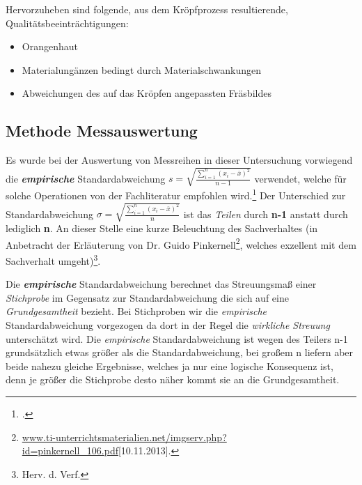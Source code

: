 \documentclass[12pt,a4paper,parskip]{scrartcl}
\begin{document}
{Hervorzuheben sind folgende, aus dem Kröpfprozess resultierende, Qualitätsbeeinträchtigungen:
\begin{itemize}
\item Orangenhaut
\item Materialungänzen bedingt durch Materialschwankungen
\item Abweichungen des auf das Kröpfen angepassten Fräsbildes
\end{itemize}









\subsection{Methode Messauswertung}
Es wurde bei der Auswertung von Messreihen in dieser Untersuchung vorwiegend die \textbf{\emph{empirische}} Standardabweichung $ s= \sqrt{\frac{\sum \limits_{i=1}^n (x_i - \bar{x})^2}{n-1}}$ verwendet, welche für solche Operationen von der Fachliteratur empfohlen wird.\footcite[Vgl.][301]{mf} Der Unterschied zur Standardabweichung $ \sigma = \sqrt{\frac{\sum \limits_{i=1}^n (x_i - \bar{x})^2}{n}}$ ist das \emph{Teilen} durch \textbf{n-1} anstatt durch lediglich \textbf{n}.
 An dieser Stelle eine kurze Beleuchtung des Sachverhaltes  (in Anbetracht der Erläuterung von Dr. Guido Pinkernell\footnote{\url{www.ti-unterrichtsmaterialien.net/imgserv.php?id=pinkernell_106.pdf}[10.11.2013].‎}, welches exzellent mit dem Sachverhalt umgeht)\footnote{Herv. d. Verf.}.



Die \textbf{\emph{empirische}} Standardabweichung berechnet das Streuungsmaß einer \emph{Stichprobe} im Gegensatz zur Standardabweichung die sich auf eine \emph{Grundgesamtheit} bezieht. Bei Stichproben wir die \emph{empirische} Standardabweichung vorgezogen da dort in der Regel die \emph{wirkliche Streuung} unterschätzt wird. Die \emph{empirische} Standardabweichung ist wegen des Teilers n-1 grundsätzlich etwas größer als die Standardabweichung, bei großem n liefern aber beide nahezu gleiche Ergebnisse, welches ja nur eine logische Konsequenz ist, denn je größer die Stichprobe desto näher kommt sie an die Grundgesamtheit.

\medskip

}
\end{document}

